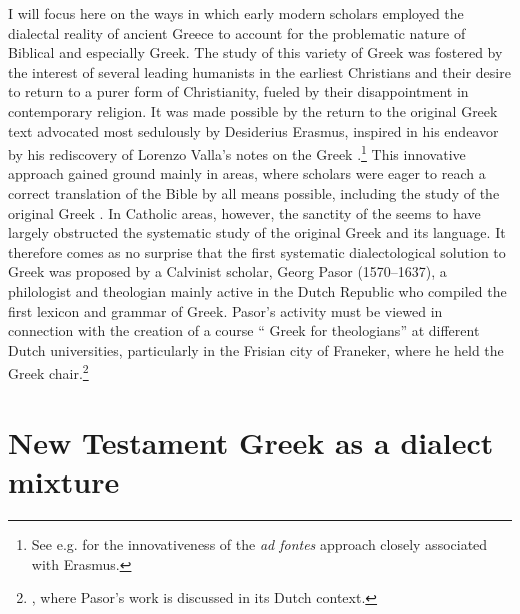 I will focus here on the ways in which early modern scholars employed the dialectal reality of ancient Greece to account for the problematic nature of Biblical and especially  Greek. The study of this variety of Greek was fostered by the interest of several leading humanists in the earliest Christians and their desire to return to a purer form of Christianity, fueled by their disappointment in contemporary religion. It was made possible by the return to the original Greek text advocated most sedulously by Desiderius Erasmus, inspired in his endeavor by his rediscovery of Lorenzo Valla’s notes on the Greek .\footnote{See e.g. \citet[esp. 31]{Bentley1983} for the innovativeness of the \textit{ad fontes} approach closely associated with Erasmus.} This innovative approach gained ground mainly in  areas, where scholars were eager to reach a correct  translation of the Bible by all means possible, including the study of the original Greek . In Catholic areas, however, the sanctity of the   seems to have largely obstructed the systematic study of the original Greek  and its language. It therefore comes as no surprise that the first systematic dialectological solution to  Greek was proposed by a Calvinist scholar, Georg Pasor (1570–1637), a  philologist and theologian mainly active in the Dutch Republic who compiled the first lexicon and grammar of  Greek. Pasor’s activity must be viewed in connection with the creation of a course “ Greek for theologians” at different Dutch universities, particularly in the Frisian city of Franeker, where he held the Greek chair.\footnote{, where Pasor’s work is discussed in its Dutch context.}

\section{New Testament Greek as a dialect mixture}\label{sec:4.5}

